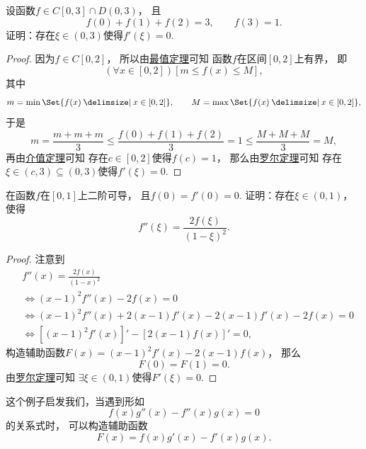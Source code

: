 \begin{example}
设函数\(f \in C[0,3] \cap D(0,3)\)，
且\begin{equation*}
	f(0) + f(1) + f(2) = 3,
	\qquad
	f(3) = 1.
\end{equation*}
证明：存在\(\xi\in(0,3)\)使得\(f'(\xi) = 0\).
\begin{proof}
因为\(f \in C[0,2]\)，
所以由\hyperref[theorem:极限.最值定理]{最值定理}可知
函数\(f\)在区间\([0,2]\)上有界，
即\begin{equation*}
	(\forall x\in[0,2])
	[m \leq f(x) \leq M],
\end{equation*}
其中\begin{equation*}
	m = \min\Set{ f(x) \given x\in[0,2] },
	\qquad
	M = \max\Set{ f(x) \given x\in[0,2] },
\end{equation*}
于是\begin{equation*}
	m = \frac{m+m+m}3 \leq \frac{f(0) + f(1) + f(2)}3 = 1 \leq \frac{M+M+M}3 = M,
\end{equation*}
再由\hyperref[theorem:极限.闭区间上连续函数的性质.介值定理2]{介值定理}可知
存在\(c\in[0,2]\)使得\(f(c) = 1\)，
那么由\hyperref[theorem:微分中值定理.罗尔定理]{罗尔定理}可知
存在\(\xi\in(c,3)\subseteq(0,3)\)使得\(f'(\xi) = 0\).
\end{proof}
\end{example}

\begin{example}
在函数\(f\)在\([0,1]\)上二阶可导，
且\(f(0) = f'(0) = 0\).
证明：存在\(\xi\in(0,1)\)，
使得\begin{equation*}
	f''(\xi) = \frac{2 f(\xi)}{(1-\xi)^2}.
\end{equation*}
\begin{proof}
注意到\begin{align*}
	&f''(x) = \frac{2 f(x)}{(1-x)^2} \\
	&\iff
	(x-1)^2 f''(x) - 2 f(x) = 0 \\
	&\iff
	(x-1)^2 f''(x) + 2 (x-1) f'(x) - 2 (x-1) f'(x) - 2 f(x) = 0 \\
	&\iff
	[(x-1)^2 f'(x)]' - [2 (x-1) f(x)]' = 0,
\end{align*}
构造辅助函数\(F(x) = (x-1)^2 f'(x) - 2 (x-1) f(x)\)，
那么\begin{equation*}
	F(0) = F(1) = 0.
\end{equation*}
由\hyperref[theorem:微分中值定理.罗尔定理]{罗尔定理}可知
\(\exists\xi\in(0,1)\)使得\(F'(\xi) = 0\).
\end{proof}
\end{example}
\begin{remark}
这个例子启发我们，当遇到形如\begin{equation*}
	f(x) g''(x) - f''(x) g(x) = 0
\end{equation*}的关系式时，
可以构造辅助函数\begin{equation*}
	F(x) = f(x) g'(x) - f'(x) g(x).
\end{equation*}
\end{remark}


